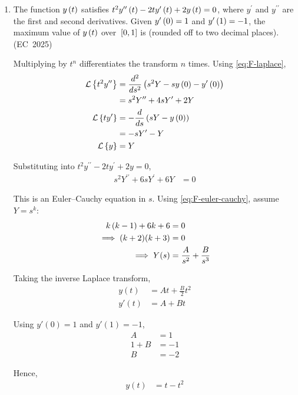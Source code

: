 \begin{enumerate}[label=\thesubsection.\arabic*, ref=\thesubsection.\theenumi]
\item
The function $y\left(t\right)$ satisfies $t^2y^{\prime\prime}\left(t\right)-2ty^{\prime}\left(t\right)+2y\left(t\right)=0$, where $y^{\prime}$ and $y^{\prime\prime}$ are the first and second derivatives. Given $y^{\prime}\left(0\right)=1$ and $y^{\prime}\left(1\right)=-1$, the maximum value of $y\left(t\right)$ over ${}\left[0,1\right]$ is \underline{\hspace{1cm}} (rounded off to two decimal places).
\hfill (EC~2025)
\\


\solution

Multiplying by $t^n$ differentiates the transform $n$ times. Using \eqref{eq:F-laplace},
\begin{align}
\mathcal{L}\left\{t^2y^{\prime\prime}\right\}
&=\frac{d^2}{ds^2}\left(s^2Y-sy\left(0\right)-y^{\prime}\left(0\right)\right)
\\
&=s^2Y^{\prime\prime}+4sY^{\prime}+2Y
\\
\mathcal{L}\left\{ty^{\prime}\right\}
&=-\frac{d}{ds}\left(sY-y\left(0\right)\right)
\\
&=-sY^{\prime}-Y
\\
\mathcal{L}\left\{y\right\}&=Y
\end{align}

Substituting into $t^2y^{\prime\prime}-2ty^{\prime}+2y=0$,
\begin{align}
s^2Y^{\prime\prime}+6sY^{\prime}+6Y&=0
\end{align}

This is an Euler--Cauchy equation in $s$. Using \eqref{eq:F-euler-cauchy}, assume $Y=s^k$:
\begin{align}
k\left(k-1\right)+6k+6&=0
\\
\implies (k+2)(k+3)&=0
\\
\implies Y(s)&=\frac{A}{s^2}+\frac{B}{s^3}
\end{align}

Taking the inverse Laplace transform,
\begin{align}
y(t)&=At+\frac{B}{2}t^2
\\
y'(t)&=A+Bt
\end{align}

Using $y'(0)=1$ and $y'(1)=-1$,
\begin{align}
A&=1\\
1+B&=-1\\
B&=-2
\end{align}

Hence,
\begin{align}
y(t)&=t-t^2
\end{align}


\end{enumerate}
